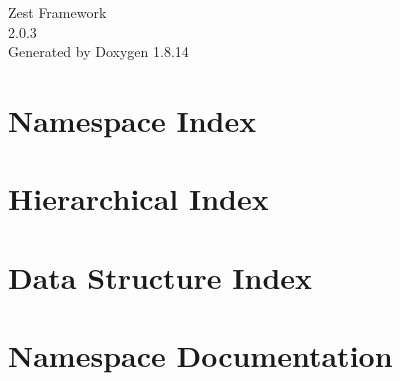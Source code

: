 \documentclass[twoside]{book}
\newcommand{\+}{\discretionary{\mbox{\scriptsize$\hookleftarrow$}}{}{}}
\newcommand{\clearemptydoublepage}{%
  \newpage{\pagestyle{empty}\cleardoublepage}%
}
\begin{document}
\hypersetup{pageanchor=false,
             bookmarksnumbered=true,
             pdfencoding=unicode
            }
\begin{titlepage}
\vspace*{7cm}
\begin{center}%
{\Large Zest Framework \\[1ex]\large 2.\+0.\+3 }\\
\vspace*{1cm}
{\large Generated by Doxygen 1.8.14}\\
\end{center}
\end{titlepage}
\clearemptydoublepage
{}
\tableofcontents
\clearemptydoublepage
{}
\hypersetup{pageanchor=true}

\chapter{Namespace Index}

\chapter{Hierarchical Index}

\chapter{Data Structure Index}

\chapter{Namespace Documentation}







































\end{document}
